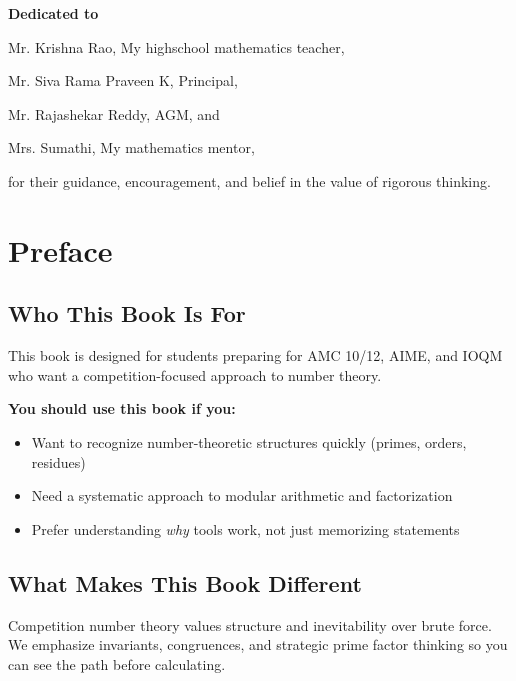 \documentclass[12pt]{extarticle}
\begin{document}
\thispagestyle{empty}
\vspace*{\fill}
\begin{center}
\Large

\textbf{Dedicated to}

\vspace{1cm}

Mr. Krishna Rao, My highschool mathematics teacher,

Mr. Siva Rama Praveen K, Principal,

Mr. Rajashekar Reddy, AGM, and

Mrs. Sumathi, My mathematics mentor,

\vspace{1cm}

for their guidance, encouragement, and belief in the value of rigorous thinking.
\end{center}
\vspace*{\fill}

\newpage

	\tableofcontents
\newpage

\section*{Preface}

\subsection*{Who This Book Is For}
This book is designed for students preparing for AMC 10/12, AIME, and IOQM who want a competition-focused approach to number theory.

\textbf{You should use this book if you:}
\begin{itemize}
    \item Want to recognize number-theoretic structures quickly (primes, orders, residues)
    \item Need a systematic approach to modular arithmetic and factorization
    \item Prefer understanding \emph{why} tools work, not just memorizing statements
\end{itemize}

\subsection*{What Makes This Book Different}
Competition number theory values structure and inevitability over brute force. We emphasize invariants, congruences, and strategic prime factor thinking so you can see the path before calculating.
\end{document}
